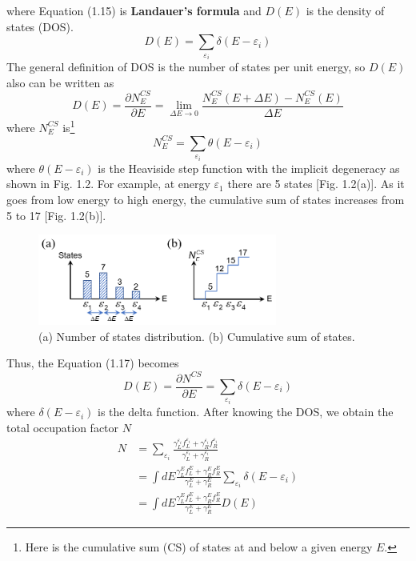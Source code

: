 where Equation (1.15) is {\bf Landauer's formula} and $D\left(E\right)$ is the density of states (DOS). 
\begin{equation}
D\left(E\right) = \sum_{\varepsilon_i}{\delta\left(E-\varepsilon_i\right)}
\end{equation} 
The general definition of DOS is the number of states per unit energy, so $D\left(E\right)$ also can be written as 
\begin{equation}
D\left(E\right) = \frac{\partial N^{CS}_{E}}{\partial E} = \lim_{\Delta E\rightarrow 0} \frac{N^{CS}_{E}\left(E+\Delta E\right)-N^{CS}_{E}\left(E\right)}{\Delta E}
\end{equation} 
where $N^{CS}_{E}$ is\footnote{Here is the cumulative sum (CS) of states at and below a given energy $E$.} 
\begin{equation}
N_{E}^{CS} = \sum_{\varepsilon_i}{\theta\left(E-\varepsilon_i\right)}
\end{equation} 
where $\theta\left(E-\varepsilon_i\right)$ is the Heaviside step function with the implicit degeneracy as shown in Fig. 1.2. For example, at energy $\varepsilon_{1}$ there are 5 states [Fig. 1.2(a)]. As it goes from low energy to high energy, the cumulative sum of states increases from 5 to 17 [Fig. 1.2(b)].
\begin{figure}[tbp]
\includegraphics[width=0.7\textwidth]{figures/Fig1_2}
\centering
\caption{\small (a) Number of states distribution. (b) Cumulative sum of states.}
\end{figure} Thus, the Equation (1.17) becomes \begin{equation}
D\left(E\right) = \frac{\partial N^{CS}}{\partial E} = \sum_{\varepsilon_{i}}{\delta\left(E-\varepsilon_{i}\right)}
\end{equation} where $\delta\left(E-\varepsilon_{i}\right)$ is the delta function. After knowing the DOS, we obtain the total occupation factor $N$ 
\begin{align}
N&= \sum_{\varepsilon_{i}}{\frac{\gamma^{\varepsilon_i}_{L} f^{\varepsilon_i}_{L} + \gamma^{\varepsilon_i}_{R} f^{\varepsilon_i}_{R}}{\gamma^{\varepsilon_i}_{L}+\gamma^{\varepsilon_i}_{R}}}\nonumber\\
&= \int dE \frac{\gamma^E_{L} f^E_{L} + \gamma^E_{R} f^E_{R}}{\gamma^E_{L}+\gamma^E_{R}} \sum_{\varepsilon_{i}}{\delta\left(E-\varepsilon_{i}\right)}\nonumber\\
&= \int dE \frac{\gamma^E_{L} f^E_{L} + \gamma^E_{R} f^E_{R}}{\gamma^E_{L}+\gamma^E_{R}}D\left(E\right)
\end{align} 
